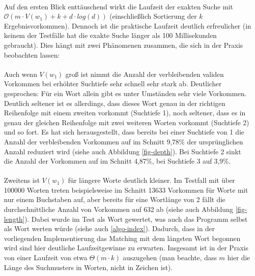 \paragraph{} Auf den ersten Blick enttäuschend wirkt die Laufzeit der exakten Suche mit $\mathcal{O}(m \cdot V(w_1) + k + d \cdot log(d))$ (einschließlich Sortierung der $k$ Ergebnisvorkommen). Dennoch ist die praktische Laufzeit deutlich erfreulicher (in keinem der Testfälle hat die exakte Suche länger als 100 Millisekunden gebraucht). Dies hängt mit zwei Phänomenen zusammen, die sich in der Praxis beobachten lassen:
\paragraph{} Auch wenn $V(w_1)$ groß ist nimmt die Anzahl der verbleibenden validen Vorkommen bei erhöhter Suchtiefe sehr schnell sehr stark ab. Deutlicher gesprochen: Für ein Wort allein gibt es unter Umständen sehr viele Vorkommen. Deutlich seltener ist es allerdings, dass dieses Wort genau in der richtigen Reihenfolge mit einem zweiten vorkommt (Suchtiefe 1), noch seltener, dass es in genau der gleichen Reihenfolge mit zwei weiteren Worten vorkommt (Suchtiefe 2) und so fort. Es hat sich herausgestellt, dass bereits bei einer Suchtiefe von 1 die Anzahl der verbleibenden Vorkommen auf im Schnitt 9,78\% der ursprünglichen Anzahl reduziert wird (siehe auch Abbildung \ref{fig-depth}). Bei Suchtiefe 2 sinkt die Anzahl der Vorkommen auf im Schnitt 4,87\%, bei Suchtiefe 3 auf 3,9\%.


\paragraph{} Zweitens ist $V(w_1)$ für längere Worte deutlich kleiner. Im Testfall mit über 100000 Worten treten beispielsweise im Schnitt 13633 Vorkommen für Worte mit nur einem Buchstaben auf, aber bereits für eine Wortlänge von 2 fällt die durchschnittliche Anzahl von Vorkommen auf 632 ab (siehe auch Abbildung \ref{fig-length}). Dabei wurde im Test als Wort gewertet, was auch das Programm selbst als Wort werten würde (siehe auch \ref{algo-index}). Dadurch, dass in der vorliegenden Implementierung das Matching mit dem längsten Wort begonnen wird sind hier deutliche Laufzeitgewinne zu erwarten. Insgesamt ist in der Praxis von einer Laufzeit von etwa $\Theta(m \cdot k)$ auszugehen (man beachte, dass $m$ hier die Länge des Suchmusters in Worten, nicht in Zeichen ist).

